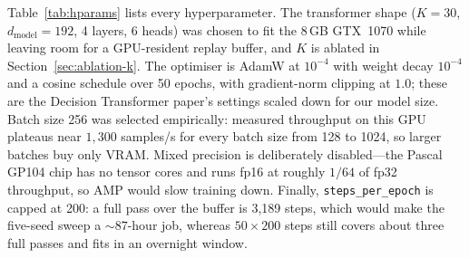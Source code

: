 \documentclass[11pt]{article}
\begin{document}
Table~\ref{tab:hparams} lists every hyperparameter. The transformer shape
($K=30$, $d_{\text{model}}=192$, 4 layers, 6 heads) was chosen to fit the 8\,GB GTX~1070 while
leaving room for a GPU-resident replay buffer, and $K$ is ablated in
Section~\ref{sec:ablation-k}. The optimiser is AdamW \cite{loshchilov2019decoupled} at
$10^{-4}$ with weight decay $10^{-4}$ and a cosine schedule over 50 epochs, with gradient-norm
clipping at $1.0$; these are the Decision Transformer paper's settings scaled down for our
model size. Batch size 256 was selected empirically: measured throughput on this GPU plateaus
near $1{,}300$ samples/s for every batch size from 128 to 1024, so larger batches buy only
VRAM. Mixed precision is deliberately disabled---the Pascal GP104 chip has no tensor cores and
runs fp16 at roughly $1/64$ of fp32 throughput, so AMP would slow training down. Finally,
\texttt{steps\_per\_epoch} is capped at 200: a full pass over the buffer is 3{,}189 steps, which
would make the five-seed sweep a ${\sim}87$-hour job, whereas $50 \times 200$ steps still covers
about three full passes and fits in an overnight window.
\end{document}
